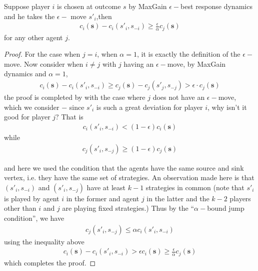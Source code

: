 \begin{lemma}
Suppose player $i$ is chosen at outcome $s$ by MaxGain $\epsilon-$best response dynamics and he takes the $\epsilon-$ move $s'_i$,then
\begin{align}
c_i(\mathbf{s})-c_i(s'_i,s_{-i})\geq \frac{\epsilon}{\alpha}c_j(\mathbf{s})\label{eq:costofdevplayer}
\end{align}
for any other agent $j$.
\label{lemma:costofdevplayer}
\begin{proof}
For the case when $j=i$, when $\alpha=1$, it is exactly the definition of the $\epsilon-$move. Now consider when $i \neq j$ with $j$ having an $\epsilon-$move, by MaxGain dynamics and $\alpha=1$,
\begin{align*}
c_i(\mathbf{s})-c_i(s'_i,s_{-i})\geq c_j(\mathbf{s})-c_j(s'_j,s_{-j})>\epsilon\cdot c_j(\mathbf{s})
\end{align*}
the proof is completed by with the case where $j$ does not have an $\epsilon-$move, which we consider $-$ since $s'_i$ is such a great deviation for player $i$, why isn't it good for player $j$? That is 
\begin{align*}
c_i(s'_i,s_{-i})<(1-\epsilon)c_i(\mathbf{s})
\end{align*}
while
\begin{align*}
c_j(s'_i,s_{-j})\geq(1-\epsilon)c_j(\mathbf{s})
\end{align*}

and here we used the condition that the agents have the same source and sink vertex, i.e. they have the same set of strategies. An observation made here is that $(s'_i,s_{-i})$ and $(s'_i,s_{-j})$ have at least $k-1$ strategies in common (note that $s'_i$ is played by agent $i$ in the former and agent $j$ in the latter and the $k-2$ players other than $i$ and $j$ are playing fixed strategies.) Thus by the ``$\alpha-$bound jump condition'', we have
\begin{align*}
c_j(s'_i,s_{-j})\leq \alpha c_i(s'_i,s_{-i})
\end{align*}
using the inequality above
\begin{align*}
c_i(\mathbf{s})-c_i(s'_i,s_{-i})>\epsilon c_i(\mathbf{s})\geq \frac{\epsilon}{\alpha}c_j(\mathbf{s})
\end{align*}
which completes the proof.
\end{proof}
\end{lemma}




